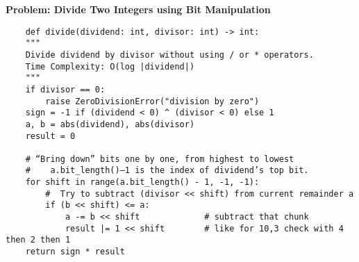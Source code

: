     \noindent\textbf{Problem: Divide Two Integers using Bit Manipulation}
    \begin{verbatim}
    def divide(dividend: int, divisor: int) -> int:
    """
    Divide dividend by divisor without using / or * operators.
    Time Complexity: O(log |dividend|)
    """
    if divisor == 0:
        raise ZeroDivisionError("division by zero")
    sign = -1 if (dividend < 0) ^ (divisor < 0) else 1
    a, b = abs(dividend), abs(divisor)
    result = 0

    # “Bring down” bits one by one, from highest to lowest
    #    a.bit_length()–1 is the index of dividend’s top bit.
    for shift in range(a.bit_length() - 1, -1, -1):
        #  Try to subtract (divisor << shift) from current remainder a
        if (b << shift) <= a:
            a -= b << shift             # subtract that chunk
            result |= 1 << shift        # like for 10,3 check with 4 then 2 then 1
    return sign * result

    \end{verbatim}
% 
